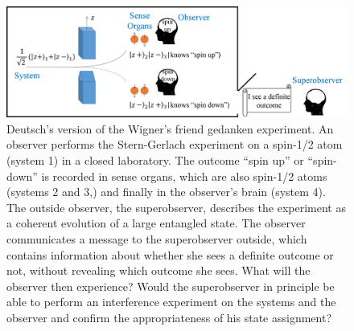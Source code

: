 \documentclass[12pt,a4]{article}
\begin{document}
\begin{figure}
\begin{center}
\includegraphics[width=12.4cm]{Slika2.png}
\end{center}
\caption{Deutsch's version of the Wigner's friend gedanken experiment. An observer performs the Stern-Gerlach experiment on a spin-1/2 atom (system 1) in a closed laboratory. The outcome ``spin up'' or ``spin-down'' is recorded in sense organs, which are also spin-1/2 atoms (systems 2 and 3,) and finally in the observer's brain (system 4). The outside observer, the superobserver, describes the experiment as a coherent evolution of a large entangled state. The observer communicates a message to the superobserver outside, which contains information about whether she sees a definite outcome or not, without revealing which outcome she sees. What will the observer then experience? Would the superobserver in principle be able to perform an interference experiment on the systems and the observer and confirm the appropriateness of his state assignment?} \label{figure2}
\end{figure}
\end{document}
